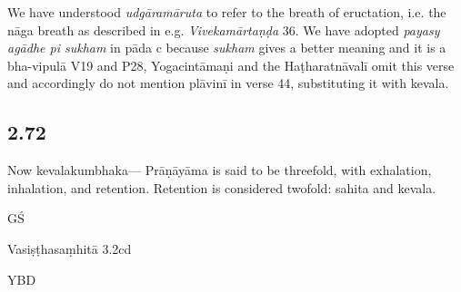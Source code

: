 \begin{ekdosis}
\begin{philcomm}[hp02_071]
We have understood \emph{udgāramāruta} to refer to the breath of eructation, i.e. the nāga breath as described in e.g. \emph{Vivekamārtaṇḍa} 36.
We have adopted \emph{payasy agādhe pi sukham} in pāda c because \emph{sukham} gives a better meaning and it is a bha-vipulā
 V19 and P28, Yogacintāmaṇi and the Haṭharatnāvalī omit this verse and accordingly do not mention plāvinī in verse 44, substituting it with kevala.
\end{philcomm}

\subsection*{2.72}
\begin{translation}[hp02_072]
Now kevalakumbhaka---
Prāṇāyāma is said to be threefold, with exhalation, inhalation, and retention. Retention is considered twofold: sahita and kevala.

\end{translation}

\begin{sources}[hp02_072]
GŚ

\begin{versinnote}
\end{versinnote}

Vasiṣṭhasaṃhitā 3.2cd

\begin{versinnote}
\end{versinnote}
\end{sources}

\begin{testimonia}[hp02_072]
YBD

\begin{versinnote}
\end{versinnote}
\end{testimonia}

\begin{philcomm}[hp02_072]
\end{philcomm}


\end{ekdosis}
